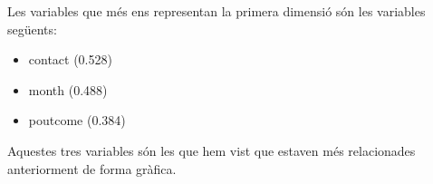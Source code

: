 \documentclass[
]{article}
\newenvironment{Shaded}{\begin{snugshade}}{\end{snugshade}}
\newcommand{\AttributeTok}[1]{\textcolor[rgb]{0.77,0.63,0.00}{#1}}
\newcommand{\NormalTok}[1]{#1}
\newcommand{\SpecialCharTok}[1]{\textcolor[rgb]{0.00,0.00,0.00}{#1}}
\newcommand{\StringTok}[1]{\textcolor[rgb]{0.31,0.60,0.02}{#1}}
\begin{document}
Les variables que més ens representan la primera dimensió són les
variables següents:

\begin{itemize}
\item
  contact (0.528)
\item
  month (0.488)
\item
  poutcome (0.384)
\end{itemize}

Aquestes tres variables són les que hem vist que estaven més
relacionades anteriorment de forma gràfica.

\begin{Shaded}
\end{Shaded}
\end{document}
